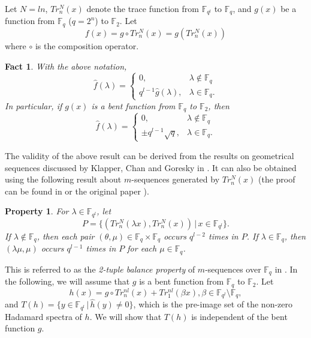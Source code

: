 \documentclass{article}
\newtheorem{fact}{Fact}
\newtheorem{property}{Property}
\newcommand{\F}{\ensuremath{\mathbb F}}
\begin{document}
 Let $N=ln$, $Tr_n^N(x)$ denote the trace function from $\F_{q^l}$ to $\F_{q}$,  and 
  $g(x)$ be a function from
$\F_q$   ($q=2^n$) to $\F_2$. Let 
\begin{equation}\label{eq-comp}
f(x)=g\circ Tr_n^N(x)=g(Tr_n^N(x))
\end{equation}
 where
$\circ$ is the  composition operator. 

\begin{fact}\label{prop-bent} With the above notation,
\[
\widehat{f}(\lambda)=\left \{\begin{array}{ll}
0, & \lambda \notin \F_q\\
q^{l-1}\widehat{g}(\lambda), & \lambda \in \F_q.
\end{array}
\right.
\]
In particular, if $g(x)$ is a bent function from $\F_q$ to $\F_2$, then
\[
\widehat{f}(\lambda)=\left \{\begin{array}{ll}
0, & \lambda \notin \F_q\\
\pm q^{l-1} \sqrt{q}, & \lambda \in \F_q.
\end{array}
\right.
\]
\end{fact}

 The validity of the above result can be derived from the results on geometrical
  sequences discussed by Klapper, Chan and Goresky
 in \cite{Klapper-Chan-Goresky2}.  It  can also  be obtained using the following result about
$m$-sequences generated by $Tr_n^N(x)$  (the proof can be found in
\cite{Golomb-Gong}
 or the original paper \cite{Zierler}).
\begin{property}\label{fact-m}
For $\lambda \in \F_{q^l}$, let
\[
P=\{(Tr_n^N(\lambda x),Tr_n^N(x)) \,|\, x\in \F_{q^l}\}.
\]
If $\lambda \notin \F_q$, then each pair $(\theta, \mu)\in
\F_q\times \F_q$ occurs $q^{l-2}$ times in $P$. If $\lambda \in
\F_q$, then $(\lambda \mu, \mu)$ occurs  $q^{l-1}$ times in $P$
for each $\mu \in \F_q$.
\end{property}

This is referred to as the {\em 2-tuple balance property} of
$m$-sequences over $\F_q$ in \cite{Golomb-Gong}. In the following, we will assume that  $g$ is a bent function from $\F_q$ to $\F_2$. Let 
\begin{equation}\label{eq-comp}
h(x)=g\circ Tr_n^{nl}(x) +Tr_1^{nl}(\beta x),    \beta \in \F_{q^l} \setminus
 \F_q, 
\end{equation}
and   $T(h)=\{y  \in \F_{q^l} \,|\, \widehat{h}(y ) \not = 0 \}$, which is the pre-image set of the non-zero Hadamard spectra  of $h$.  We will show that $T(h)$ is independent of the bent function $g$. 
\end{document}
